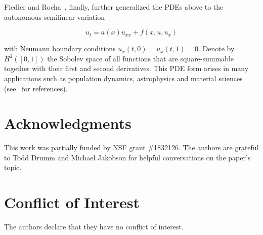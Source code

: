 \documentclass{article}
\newcommand{\jim}{\color{black} }
\begin{document}
Fiedler and Rocha~\cite{FR96}, finally, further generalized the PDEs above to the autonomous semilinear variation
\begin{linenomath}
\begin{equation*}
u_t=a(x)u_{xx}+f(x,u,u_x)
\end{equation*}
\end{linenomath}
with Neumann boundary conditions $u_x(t,0)=u_x(t,1)=0$.
Denote by $H^2([0,1])$ the Sobolev space of all functions that are square-summable together with their first and second derivatives. 
This PDE form arises in many applications such as population dynamics, astrophysics and material sciences (see~\cite{FR00} for references).

{\jim
\section*{Acknowledgments} This work was partially funded by NSF grant \#1832126. The authors are  grateful to Todd Drumm and Michael Jakobson for helpful conversations on the paper's topic.  

\section*{Conflict of Interest} The authors declare that they have no conflict of interest.
}
%

\end{document}

